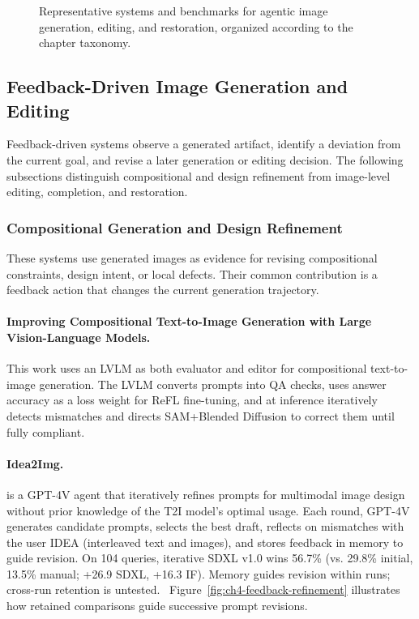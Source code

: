 \begin{figure}[!htbp]
  \centering
  
  \caption{Representative systems and benchmarks for agentic image generation, editing, and restoration, organized according to the chapter taxonomy.}
  \label{fig:ch4-representative-systems}
\end{figure}

\subsection{Feedback-Driven Image Generation and Editing}
Feedback-driven systems observe a generated artifact, identify a deviation from the current goal, and revise a later generation or editing decision. The following subsections distinguish compositional and design refinement from image-level editing, completion, and restoration.

\subsubsection{Compositional Generation and Design Refinement}
These systems use generated images as evidence for revising compositional constraints, design intent, or local defects. Their common contribution is a feedback action that changes the current generation trajectory.

\paragraph{Improving Compositional Text-to-Image Generation with Large Vision-Language Models.}
This work uses an LVLM as both evaluator and editor for compositional text-to-image generation. The LVLM converts prompts into QA checks, uses answer accuracy as a loss weight for ReFL fine-tuning, and at inference iteratively detects mismatches and directs SAM+Blended Diffusion to correct them until fully compliant. ~\cite{wen2023compositional}

\paragraph{Idea2Img.}
 is a GPT-4V agent that iteratively refines prompts for multimodal image design without prior knowledge of the T2I model's optimal usage. Each round, GPT-4V generates candidate prompts, selects the best draft, reflects on mismatches with the user IDEA (interleaved text and images), and stores feedback in memory to guide revision. On 104 queries, iterative SDXL v1.0 wins 56.7\% (vs. 29.8\% initial, 13.5\% manual; +26.9 SDXL, +16.3 IF). Memory guides revision within runs; cross-run retention is untested.~\cite{yang2024idea2img} Figure~\ref{fig:ch4-feedback-refinement} illustrates how retained comparisons guide successive prompt revisions.

